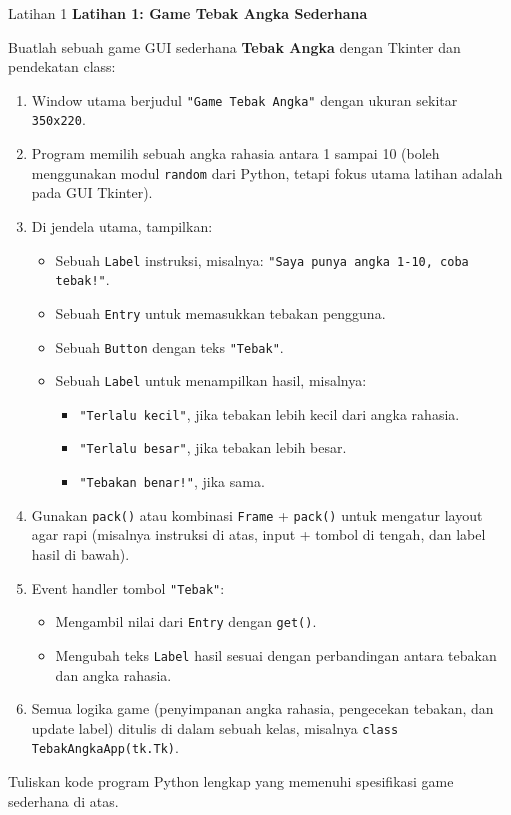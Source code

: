\documentclass[aspectratio=169, table]{beamer}
\begin{document}
\begin{frame}[fragile,allowframebreaks=0.8]{Latihan 1}
\footnotesize
\textbf{Latihan 1: Game Tebak Angka Sederhana}\par\medskip
Buatlah sebuah game GUI sederhana \textbf{Tebak Angka} dengan Tkinter dan pendekatan class:
  \begin{enumerate}
    \item Window utama berjudul \texttt{"Game Tebak Angka"} dengan ukuran sekitar \texttt{350x220}.
    \item Program memilih sebuah angka rahasia antara 1 sampai 10 (boleh menggunakan modul \texttt{random} dari Python, tetapi fokus utama latihan adalah pada GUI Tkinter).
    \item Di jendela utama, tampilkan:
          \begin{itemize}
            \item Sebuah \texttt{Label} instruksi, misalnya: \texttt{"Saya punya angka 1-10, coba tebak!"}.
            \item Sebuah \texttt{Entry} untuk memasukkan tebakan pengguna.
            \item Sebuah \texttt{Button} dengan teks \texttt{"Tebak"}.
            \item Sebuah \texttt{Label} untuk menampilkan hasil, misalnya:
                  \begin{itemize}
                    \item \texttt{"Terlalu kecil"}, jika tebakan lebih kecil dari angka rahasia.
                    \item \texttt{"Terlalu besar"}, jika tebakan lebih besar.
                    \item \texttt{"Tebakan benar!"}, jika sama.
                  \end{itemize}
          \end{itemize}
    \item Gunakan \texttt{pack()} atau kombinasi \texttt{Frame} + \texttt{pack()} untuk mengatur layout agar rapi (misalnya instruksi di atas, input + tombol di tengah, dan label hasil di bawah).
    \item Event handler tombol \texttt{"Tebak"}:
          \begin{itemize}
            \item Mengambil nilai dari \texttt{Entry} dengan \texttt{get()}.
            \item Mengubah teks \texttt{Label} hasil sesuai dengan perbandingan antara tebakan dan angka rahasia.
          \end{itemize}
    \item Semua logika game (penyimpanan angka rahasia, pengecekan tebakan, dan update label) ditulis di dalam sebuah kelas, misalnya \texttt{class TebakAngkaApp(tk.Tk)}.
  \end{enumerate}
  Tuliskan kode program Python lengkap yang memenuhi spesifikasi game sederhana di atas.
\end{frame}
\end{document}
